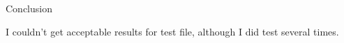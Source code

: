 \documentclass[11pt]{article}
\begin{document}
    \begin{center}
    \end{center}
    { \hspace*{\fill} \\}
    
    \begin{center}
    \end{center}
    { \hspace*{\fill} \\}
    
    \begin{center}
    \end{center}
    { \hspace*{\fill} \\}
    
    \begin{center}
    \end{center}
    { \hspace*{\fill} \\}
    
    Conclusion

I couldn't get acceptable results for test file, although I did test
several times.


    
    
    
    
\end{document}
